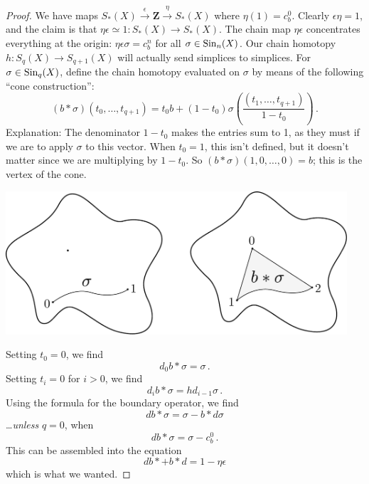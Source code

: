 		\begin{proof}
		We have maps $S_\ast(X)\xrightarrow{\epsilon}\mathbf{Z}\xrightarrow{\eta}S_\ast(X)$ where $\eta(1)=c_b^0$. Clearly $\epsilon\eta=1$, and the claim is that $\eta\epsilon\simeq1:S_\ast(X)\to S_\ast(X)$. The chain map 
$\eta\epsilon$ concentrates everything at the origin: 
$\eta\epsilon\sigma=c_b^n$ for all $\sigma\in\mathrm{Sin}_n(X)$. 
Our chain homotopy $h:S_q(X)\to S_{q+1}(X)$ will actually send simplices to simplices. For $\sigma\in\mathrm{Sin}_q(X)$, define the chain homotopy evaluated on $\sigma$ by means of the following ``cone construction'':
\[
(b*\sigma)(t_0,\ldots,t_{q+1})=t_0b+(1-t_0)\sigma\left(\frac{(t_1,\ldots,t_{q+1})}{1-t_0}\right)\,.
\]
Explanation: The denominator $1-t_0$ makes the entries sum to 1, as they must if we are to apply $\sigma$ to this vector. When $t_0=1$, this isn't defined, but it doesn't matter since we are multiplying by $1-t_0$. So
$(b*\sigma)(1,0,\ldots,0)=b$; this is the vertex of the cone. 

\begin{center}
\includegraphics[width=5in]{905/Figures/05-homotopy.pdf}
\end{center}

Setting $t_0=0$, we find
\[
d_0b*\sigma=\sigma\,.
\]
Setting $t_i=0$ for $i>0$, we find
\[
d_ib*\sigma=hd_{i-1}\sigma\,.
\]
Using the formula for the boundary operator, we find
\[
db*\sigma=\sigma-b*d\sigma
\]
\ldots {\em unless} $q=0$, when 
\[
db*\sigma=\sigma-c_b^0\,.
\]
This can be assembled into the equation
\[
db*+b*d=1-\eta\epsilon
\]
which is what we wanted. 		
\end{proof}




